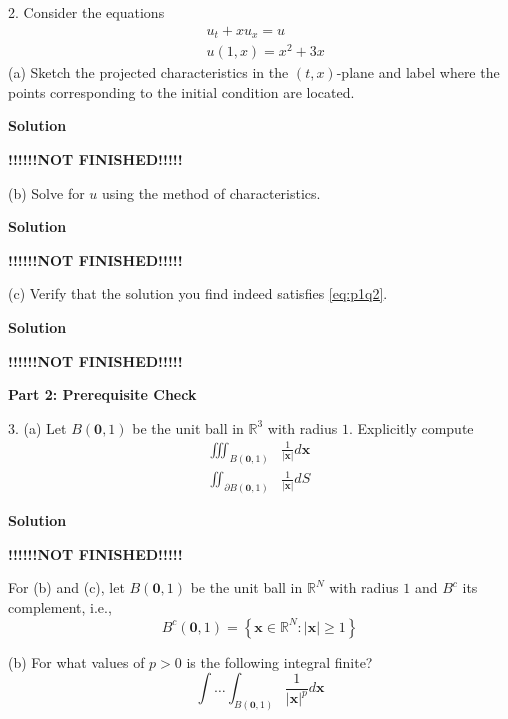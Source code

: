 \documentclass{article}
\begin{document}
\vspace{5mm}
2. Consider the equations
%
\begin{equation}
    \begin{aligned}
        &u_{t} + x u_{x} = u \\
        &u(1, x) = x^2 + 3 x
    \end{aligned}
    \label{eq:p1q2}
\end{equation}
%
(a) Sketch the projected characteristics in the $(t, x)$-plane and label
where the points corresponding to the initial condition are located.

\textbf{Solution}

\quad \textbf{!!!!!!NOT FINISHED!!!!!}

\vspace{5mm}
(b) Solve for $u$ using the method of characteristics.

\textbf{Solution}

\quad \textbf{!!!!!!NOT FINISHED!!!!!}

\vspace{5mm}
(c) Verify that the solution you find indeed satisfies \eqref{eq:p1q2}.

\textbf{Solution}

\quad \textbf{!!!!!!NOT FINISHED!!!!!}

\vspace{5mm}
\textbf{Part 2: Prerequisite Check}

3. (a) Let $B(\mathbf{0},1)$ be the unit ball in $\mathbb{R}^{3}$ with
   radius $1$. Explicitly compute
%
\begin{align}
    \iiint_{B(\mathbf{0},1)} &\frac{1}{|\mathbf{x}|} d \mathbf{x}
    \label{eq:p2q3a1} \\
    \iint_{\partial B(\mathbf{0},1)} &\frac{1}{|\mathbf{x}|} d S
    \label{eq:p2q3a2}
\end{align}

\textbf{Solution}

\quad \textbf{!!!!!!NOT FINISHED!!!!!}

\vspace{5mm}
For (b) and (c), let $B(\mathbf{0},1)$ be the unit ball in
$\mathbb{R}^{N}$ with radius $1$ and $B^{c}$ its complement, i.e.,
$$B^{c}(\mathbf{0}, 1) = \left\{\mathbf{x} \in \mathbb{R}^{N}: |\mathbf{x}| \geq 1 \right\}$$

(b) For what values of $p > 0$ is the following integral finite?
%
\begin{equation}
    \int \ldots \int_{B(\mathbf{0}, 1)} \frac{1}{|\mathbf{x}|^{p}} d \mathbf{x}
    \label{eq:p2q3b}
\end{equation}
\end{document}
